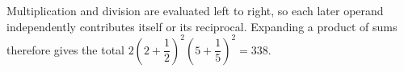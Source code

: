 Multiplication and division are evaluated left to right, so each later operand independently contributes itself or its reciprocal. Expanding a product of sums therefore gives the total $2(2+\dfrac{1}{2})^2(5+\dfrac{1}{5})^2=\boxed{338}$.
